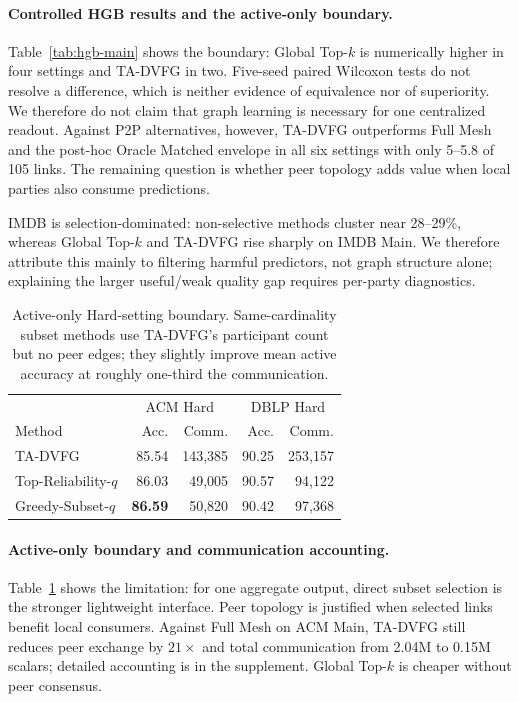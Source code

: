 \documentclass[letterpaper]{article} %
\newcommand{\method}{\textsc{TA-DVFG}}
\begin{document}
\paragraph{Controlled HGB results and the active-only boundary.}
Table~\ref{tab:hgb-main} shows the boundary: Global Top-$k$ is numerically
higher in four settings and \method{} in two. Five-seed paired Wilcoxon tests
do not resolve a difference, which is neither evidence of equivalence nor of
superiority. We therefore do not claim that graph learning is necessary for one
centralized readout. Against P2P alternatives, however, \method{} outperforms
Full Mesh and the post-hoc Oracle Matched envelope in all six settings with only
5--5.8 of 105 links. The remaining question is whether peer topology adds value
when local parties also consume predictions.

IMDB is selection-dominated: non-selective methods cluster near 28--29\%,
whereas Global Top-$k$ and \method{} rise sharply on IMDB Main. We therefore
attribute this mainly to filtering harmful predictors, not graph structure
alone; explaining the larger useful/weak quality gap requires per-party
diagnostics.

\begin{table}[!t]
\centering
\scriptsize
\setlength{\tabcolsep}{2.8pt}
\caption{Active-only Hard-setting boundary. Same-cardinality subset methods
use \method{}'s participant count but no peer edges; they slightly improve
mean active accuracy at roughly one-third the communication.}
\label{tab:active-only-boundary}
\begin{tabular}{lrrrr}
\toprule
& \multicolumn{2}{c}{ACM Hard} & \multicolumn{2}{c}{DBLP Hard} \\
Method & Acc. & Comm. & Acc. & Comm. \\
\midrule
\method{} & 85.54 & 143,385 & 90.25 & 253,157 \\
Top-Reliability-$q$ & 86.03 & 49,005 & 90.57 & 94,122 \\
Greedy-Subset-$q$ & \textbf{86.59} & 50,820 & 90.42 & 97,368 \\
\bottomrule
\end{tabular}
\end{table}

\paragraph{Active-only boundary and communication accounting.}
Table~\ref{tab:active-only-boundary} shows the limitation: for one aggregate
output, direct subset selection is the stronger lightweight interface. Peer
topology is justified when selected links benefit local consumers. Against Full
Mesh on ACM Main, \method{} still reduces peer exchange by $21\times$ and
total communication from 2.04M to 0.15M scalars; detailed accounting is in the
supplement. Global Top-$k$ is cheaper without peer consensus.
\end{document}
